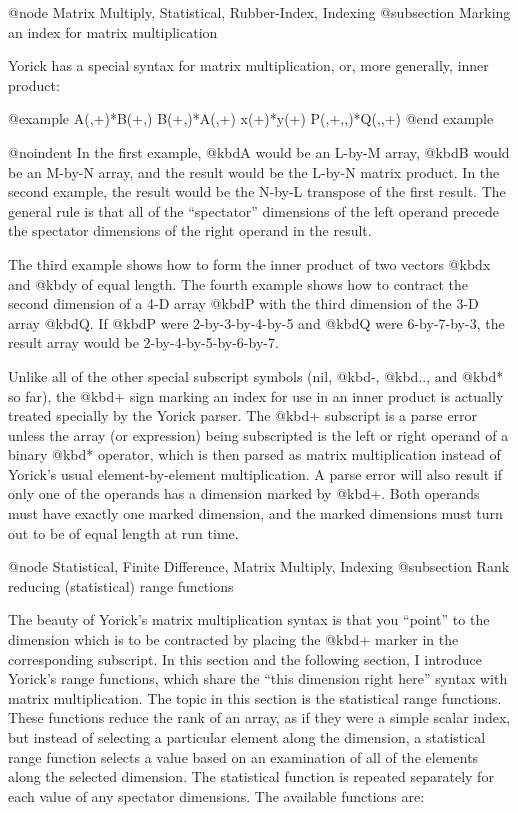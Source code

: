 @node    Matrix Multiply, Statistical, Rubber-Index, Indexing
@subsection Marking an index for matrix multiplication

Yorick has a special syntax for matrix multiplication, or, more
generally, inner product:

@example
A(,+)*B(+,)
B(+,)*A(,+)
x(+)*y(+)
P(,+,,)*Q(,,+)
@end example

@noindent
In the first example, @kbd{A} would be an L-by-M array, @kbd{B} would be
an M-by-N array, and the result would be the L-by-N matrix product.  In
the second example, the result would be the N-by-L transpose of the
first result.  The general rule is that all of the ``spectator''
dimensions of the left operand precede the spectator dimensions of the
right operand in the result.

The third example shows how to form the inner product of two vectors
@kbd{x} and @kbd{y} of equal length.  The fourth example shows how to
contract the second dimension of a 4-D array @kbd{P} with the third
dimension of the 3-D array @kbd{Q}.  If @kbd{P} were 2-by-3-by-4-by-5
and @kbd{Q} were 6-by-7-by-3, the result array would be
2-by-4-by-5-by-6-by-7.

Unlike all of the other special subscript symbols (nil, @kbd{-},
@kbd{..}, and @kbd{*} so far), the @kbd{+} sign marking an index for use
in an inner product is actually treated specially by the Yorick parser.
The @kbd{+} subscript is a parse error unless the array (or expression)
being subscripted is the left or right operand of a binary @kbd{*}
operator, which is then parsed as matrix multiplication instead of
Yorick's usual element-by-element multiplication.  A parse error will
also result if only one of the operands has a dimension marked by
@kbd{+}.  Both operands must have exactly one marked dimension, and the
marked dimensions must turn out to be of equal length at run
time.



@node    Statistical, Finite Difference, Matrix Multiply, Indexing
@subsection Rank reducing (statistical) range functions

The beauty of Yorick's matrix multiplication syntax is that you ``point''
to the dimension which is to be contracted by placing the @kbd{+} marker
in the corresponding subscript.  In this section and the following
section, I introduce Yorick's range functions, which share the ``this
dimension right here'' syntax with matrix multiplication.  The topic in
this section is the statistical range functions.  These functions reduce
the rank of an array, as if they were a simple scalar index, but instead
of selecting a particular element along the dimension, a statistical
range function selects a value based on an examination of all of the
elements along the selected dimension.  The statistical function is
repeated separately for each value of any spectator dimensions.  The
available functions are:

